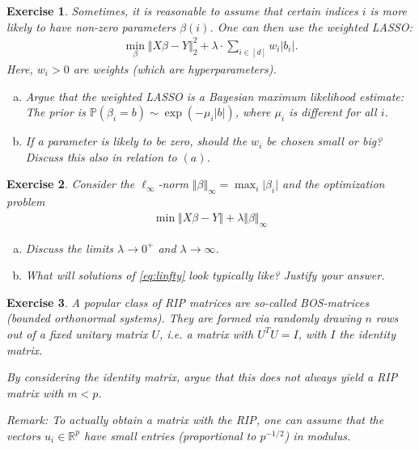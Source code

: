 \documentclass{article}
\newcommand{\R}{\mathbb{R}}
\newtheorem{exercise}{Exercise}
\newcommand{\abs}[1]{\vert #1 \vert}
\newcommand{\norm}[1]{\Vert #1 \Vert}
\begin{document}
\begin{exercise}
    Sometimes, it is reasonable to assume that certain indices $i$ is more likely to have non-zero parameters $\beta(i)$. One can then use the \emph{weighted} LASSO:
    \begin{align*}
        \min_{\beta} \norm{X\beta-Y}_2^2 + \lambda \cdot \sum_{i\in [d]} w_i\abs{b_i}.
    \end{align*}
    Here, $w_i>0$ are weights (which are hyperparameters).
    \begin{enumerate}[(a)]
        \item Argue that the weighted LASSO is a Bayesian maximum likelihood estimate: The prior is $\mathbb{P}(\beta_i=b)\sim \exp(-\mu_i \abs{b})$, where $\mu_i$ is different for all $i$.
        \item If a parameter is likely to be zero, should the $w_i$ be chosen small or big? Discuss this also in relation to $(a)$.
    \end{enumerate} 
\end{exercise}

\begin{exercise}
    Consider the $\ell_\infty$-norm $\norm{\beta}_\infty = \max_{i} \abs{\beta_i}$ and the optimization problem 
    \begin{align}
        \min \norm{X\beta - Y} + \lambda \norm{\beta}_\infty \label{eq:linfty}
    \end{align}
    \begin{enumerate}[(a)]
        \item Discuss the limits $\lambda \to 0^+$ and $\lambda \to \infty$.
        \item What will solutions of \eqref{eq:linfty} look typically like? Justify your answer.
    \end{enumerate}
\end{exercise}

\begin{exercise}
    A popular class of RIP matrices are so-called \emph{BOS}-matrices (bounded orthonormal systems). They are formed via randomly drawing $n$ rows out of a fixed unitary matrix $U$, i.e. a matrix with $U^TU=I$, with $I$ the identity matrix.

    By considering the identity matrix, argue that this does not always yield a RIP matrix with $m<p$. 
    
    \emph{Remark:} To actually obtain a matrix with the RIP, one can assume that the vectors $u_i \in \R^p$ have small entries (proportional to $p^{-1/2}$) in modulus.
\end{exercise}
\end{document}
